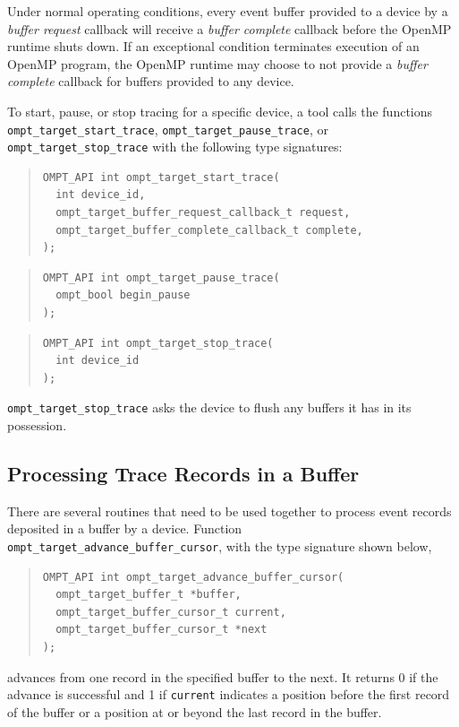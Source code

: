 \documentclass{article}
\begin{document}
Under normal operating conditions, every event buffer provided to a device by a \emph{buffer request} callback will receive a \emph{buffer complete} callback before the OpenMP runtime shuts down. If an exceptional condition terminates  execution of an OpenMP program, the OpenMP runtime may choose to not provide a \emph{buffer complete} callback for buffers provided to any device.

To start, pause, or stop tracing for a specific device, a tool calls the functions \verb|ompt_target_start_trace|, \verb|ompt_target_pause_trace|, or \verb|ompt_target_stop_trace| with the following type signatures:
\begin{quote}
\begin{verbatim}
OMPT_API int ompt_target_start_trace(
  int device_id, 
  ompt_target_buffer_request_callback_t request,
  ompt_target_buffer_complete_callback_t complete,
);
\end{verbatim}
\end{quote}

\begin{quote}
\begin{verbatim}
OMPT_API int ompt_target_pause_trace(
  ompt_bool begin_pause
);
\end{verbatim}
\end{quote}

\begin{quote}
\begin{verbatim}
OMPT_API int ompt_target_stop_trace(
  int device_id 
);
\end{verbatim}
\end{quote}
\noindent
\verb|ompt_target_stop_trace| asks the device to flush any buffers it has in its possession.

\subsection{Processing Trace Records in a Buffer}
\label{sec:record-data}

There are several routines that need to be used together to process %
event records deposited in a buffer by a device. Function \verb|ompt_target_advance_buffer_cursor|, with the type signature shown below,

\begin{quote}
\begin{verbatim}
OMPT_API int ompt_target_advance_buffer_cursor(
  ompt_target_buffer_t *buffer, 
  ompt_target_buffer_cursor_t current, 
  ompt_target_buffer_cursor_t *next
); 
\end{verbatim}
\end{quote}
advances from one record in the specified buffer to the next. It returns 0 if the advance is successful and 1 if \verb|current| indicates a position before the first record of the buffer or a position at or beyond the last record in the buffer.
\end{document}

